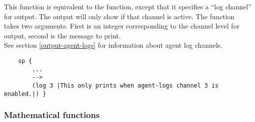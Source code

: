 \begin{description}




\item [\soarb{log} --- ] 
	This function is equivalent to the  function, except that it specifies a ``log channel'' for output. The output will only show if that channel is active. The function takes two arguments. First is an integer corresponding to the channel level for output, second is the message to print. \\
	See section \ref{output-agent-logs} for information about agent log channels.

	\begin{verbatim}
	sp {
		...
		-->
		(log 3 |This only prints when agent-logs channel 3 is enabled.|) }
	\end{verbatim}

\end{description}

\subdivider
\subsubsection*{Mathematical functions}

